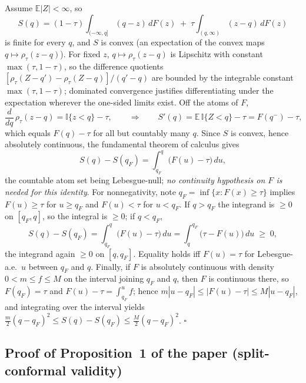 \documentclass[11pt]{article}
\begin{document}
Assume $\mathbb{E}|Z|<\infty$, so
\[
S(q) = (1-\tau)\!\int_{(-\infty,q]}\!(q-z)\,dF(z)
\;+\; \tau\!\int_{(q,\infty)}\!(z-q)\,dF(z)
\]
is finite for every $q$, and $S$ is convex (an expectation of the
convex maps $q\mapsto\rho_\tau(z-q)$). For fixed $z$, $q\mapsto
\rho_\tau(z-q)$ is Lipschitz with constant $\max(\tau,1-\tau)$, so the
difference quotients $[\rho_\tau(Z-q')-\rho_\tau(Z-q)]/(q'-q)$ are
bounded by the integrable constant $\max(\tau,1-\tau)$; dominated
convergence justifies differentiating under the expectation wherever the
one-sided limits exist. Off the atoms of $F$,
\[
\frac{d}{dq}\,\rho_\tau(z-q) = \mathbb{I}\{z<q\}-\tau ,
\qquad\Longrightarrow\qquad
S'(q) = \mathbb{E}\,\mathbb{I}\{Z<q\}-\tau = F(q^-)-\tau,
\]
which equals $F(q)-\tau$ for all but countably many $q$. Since $S$ is
convex, hence absolutely continuous, the fundamental theorem of
calculus gives
\[
S(q)-S(q_F)=\int_{q_F}^{q}\big(F(u)-\tau\big)\,du,
\]
the countable atom set being Lebesgue-null; \emph{no continuity
hypothesis on $F$ is needed for this identity}. For nonnegativity,
note $q_F=\inf\{x:F(x)\ge\tau\}$ implies $F(u)\ge\tau$ for $u\ge q_F$
and $F(u)<\tau$ for $u<q_F$. If $q>q_F$ the integrand is $\ge0$ on
$[q_F,q]$, so the integral is $\ge0$; if $q<q_F$,
\[
S(q)-S(q_F)=\int_{q_F}^{q}\big(F(u)-\tau\big)\,du
=\int_{q}^{q_F}\big(\tau-F(u)\big)\,du\;\ge\;0 ,
\]
the integrand again $\ge0$ on $[q,q_F]$. Equality holds iff $F(u)=\tau$
for Lebesgue-a.e.\ $u$ between $q_F$ and $q$. Finally, if $F$ is
absolutely continuous with density $0<m\le f\le M$ on the interval
joining $q_F$ and $q$, then $F$ is continuous there, so $F(q_F)=\tau$
and $F(u)-\tau=\int_{q_F}^{u}f$; hence $m|u-q_F|\le|F(u)-\tau|\le
M|u-q_F|$, and integrating over the interval yields
$\tfrac{m}{2}(q-q_F)^2\le S(q)-S(q_F)\le\tfrac{M}{2}(q-q_F)^2$.
\hfill$\square$

\subsection*{Proof of Proposition~1 of the paper (split-conformal
validity)}
\end{document}
